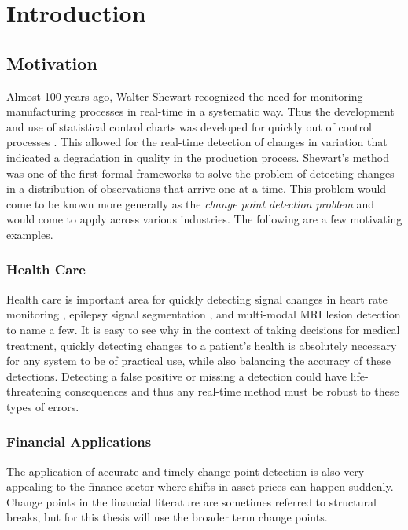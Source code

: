 \chapter{Introduction}
\section{Motivation}
Almost 100 years ago, Walter Shewart recognized the need for monitoring manufacturing processes in real-time in a systematic way. Thus the development and use of statistical control charts was developed for quickly out of control processes \cite{shewhart1931economic}. This allowed for the real-time detection of changes in variation that indicated a degradation in quality in the production process. Shewart's method was one of the first formal frameworks to solve the problem of detecting changes in a distribution of observations that arrive one at a time. This problem would come to be known more generally as the \textit{change point detection problem} and would come to apply across various industries. The following are a few motivating examples.

\subsection{Health Care}
Health care is important area for quickly detecting signal changes in heart rate monitoring \cite{yang2006adaptive} \cite{staudacher2005new}, epilepsy signal segmentation \cite{malladi2013online}, and multi-modal MRI lesion detection \cite{bosc2003automatic} to name a few. It is easy to see why in the context of taking decisions for medical treatment, quickly detecting changes to a patient's health is absolutely necessary for any system to be of practical use, while also balancing the accuracy of these detections. Detecting a false positive or missing a detection could have life-threatening consequences and thus any real-time method must be robust to these types of errors.


\subsection{Financial Applications}
The application of accurate and timely change point detection is also very appealing to the finance sector where shifts in asset prices can happen suddenly. Change points in the financial literature are sometimes referred to structural breaks, but for this thesis will use the broader term change points. %

